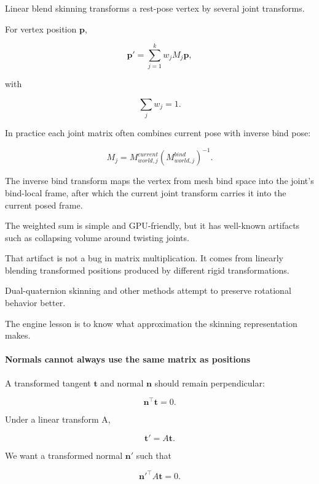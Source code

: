 \hypertarget{03-visual-computing-i-ch001-skinning-is-weighted-coordinate-transformation}{}

Linear blend skinning transforms a rest-pose vertex by several joint transforms.

For vertex position \(\mathbf p\),

\[
\mathbf p'
=
\sum_{j=1}^{k}
w_j
M_j
\mathbf p,
\]

with

\[
\sum_j w_j=1.
\]

In practice each joint matrix often combines current pose with inverse bind pose:

\[
M_j
=
M_{world,j}^{current}
\left(M_{world,j}^{bind}\right)^{-1}.
\]

The inverse bind transform maps the vertex from mesh bind space into the joint's bind-local frame, after which the current joint transform carries it into the current posed frame.

The weighted sum is simple and GPU-friendly, but it has well-known artifacts such as collapsing volume around twisting joints.

That artifact is not a bug in matrix multiplication. It comes from linearly blending transformed positions produced by different rigid transformations.

Dual-quaternion skinning and other methods attempt to preserve rotational behavior better.

The engine lesson is to know what approximation the skinning representation makes.

\paragraph{Normals cannot always use the same matrix as positions}\label{03-visual-computing-i-ch001-normals-cannot-always-use-the-same-matrix-as-positions}

\hypertarget{03-visual-computing-i-ch001-normals-cannot-always-use-the-same-matrix-as-positions}{}

A transformed tangent \(\mathbf t\) and normal \(\mathbf n\) should remain perpendicular:

\[
\mathbf n^\top\mathbf t=0.
\]

Under a linear transform A,

\[
\mathbf t'=A\mathbf t.
\]

We want a transformed normal \(\mathbf n'\) such that

\[
{\mathbf n'}^\top A\mathbf t=0.
\]

